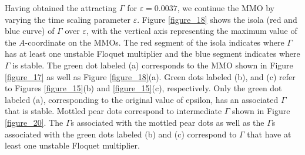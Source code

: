 \documentclass{ws-ijbc}
\begin{document}
Having obtained the attracting $\Gamma$ for $\varepsilon=0.0037$, we continue the MMO by varying the time scaling parameter $\varepsilon$.  Figure \ref{figure_18} shows the isola (red and blue curve) of $\Gamma$ over $\varepsilon$, with the vertical axis representing the maximum value of the $A$-coordinate on the MMOs.  The red segment of the isola indicates where $\Gamma$ has at least one unstable Floquet multiplier and the blue segment indicates where $\Gamma$ is stable.  The green dot labeled (a) corresponds to the MMO shown in Figure \ref{figure_17} as well as Figure \ref{figure_18}(a).  Green dots labeled (b), and (c) refer to Figures \ref{figure_15}(b) and  \ref{figure_15}(c), respectively.  Only the green dot labeled (a), corresponding to the original value of epsilon, has an associated $\Gamma$ that is stable.  Mottled pear dots correspond to intermediate $\Gamma$ shown in Figure \ref{figure_20}. The $\Gamma$s associated with the mottled pear dots as well as the $\Gamma$s associated with the green dots labeled (b) and (c) correspond to $\Gamma$ that have at least one unstable Floquet multiplier.
\end{document}

